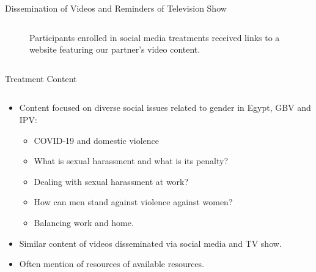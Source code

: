 \documentclass[10pt]{beamer}
\begin{document}
\begin{frame}{Dissemination of Videos and Reminders of Television Show}
\begin{columns}[T]
\begin{column}{0.5\textwidth}
\begin{figure}
\caption{Participants enrolled in social media treatments received links to a website featuring our partner's video content.} 
\end{figure} 
\end{column}
\end{columns}
\end{frame}

\begin{frame}{Treatment Content}

\begin{columns}[T] 
\begin{column}{0.55\textwidth}
\begin{itemize}
    \item Content focused on diverse social issues related to gender in Egypt, GBV and IPV:
    \begin{itemize}
        \item COVID-19 and domestic violence
        \item What is sexual harassment and what is its penalty?
        \item Dealing with sexual harassment at work?
        \item How can men stand against violence against women?
        \item Balancing work and home.
    \end{itemize}
    \item Similar content of videos disseminated via social media and TV show.
    \item Often mention of resources of available resources. 
\end{itemize}
\end{column}


\end{columns}
\end{frame}
\end{document}
